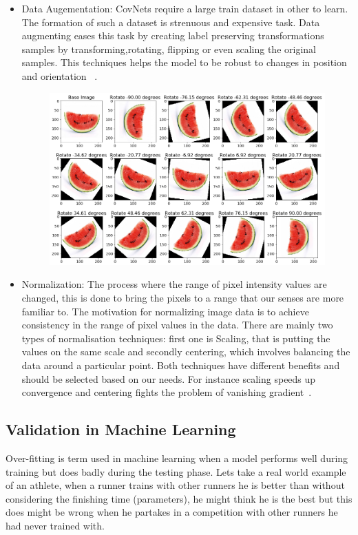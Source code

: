 \documentclass[12pt, a4paper,oneside]{report}
\begin{document}
\begin{itemize}
 	\item Data Augementation: CovNets require a large train dataset in other to learn. The formation of such a dataset is strenuous and expensive task. Data augmenting eases this task by creating label preserving transformations samples by transforming,rotating, flipping or even scaling the original samples. This techniques helps the model to be robust to changes in position and orientation ~\cite{taylor2017improving}. 
 	
 	\begin{figure}[!htb]
 		\includegraphics [scale=0.44] {augmentation.png}
 		\label{fig:augment}
 	\end{figure}
 
 \item Normalization: The process where the range of pixel intensity values are changed, this is done to bring the pixels to a range that our senses are more familiar to. The motivation for normalizing image data is to achieve consistency in the range of pixel values in the data. There are mainly two types of normalisation techniques: first one is Scaling, that is putting the values on the same scale and secondly centering, which involves balancing the data around a particular point. Both techniques have different benefits and should be selected based on our needs. For instance scaling speeds up convergence and centering fights the problem of vanishing gradient~\cite{normalizing}.

\end{itemize}

\subsection{Validation in Machine Learning}
Over-fitting is term used in machine learning when a model performs well during training but does badly during the testing phase. 
Lets take a real world example of an athlete, when a runner trains with other runners he is better than without considering the finishing time (parameters), he might think he is the best but this does might be wrong when he partakes in a competition with other runners he had never trained with.
\end{document}

